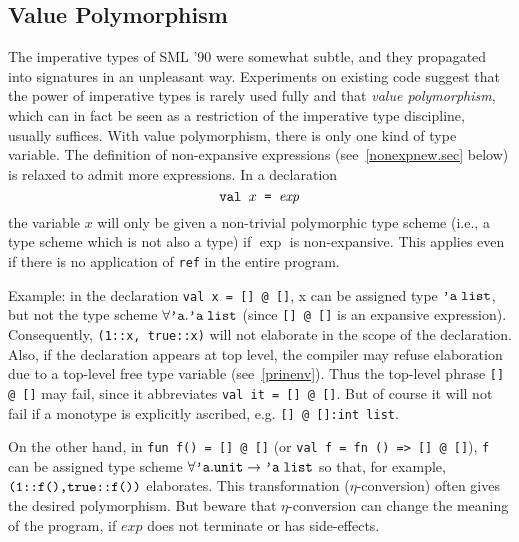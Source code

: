 \subsection{Value Polymorphism}
The imperative types of SML '90 were somewhat subtle,
and they propagated into signatures 
in an unpleasant way.
Experiments on existing code suggest
that the power of imperative types is rarely used fully and that
{\sl value polymorphism}, which can in fact be seen as a restriction of
the imperative type discipline, 
usually suffices\cite{wright95}.
With value polymorphism, there is only one kind of type variable. The definition of 
non-expansive expressions (see~\ref{nonexpnew.sec} below) is relaxed to admit more expressions.
In a declaration
$$\hbox{\tt val $x$ = ${\it exp}$}$$
the variable $x$ will only be given a non-trivial polymorphic type scheme
(i.e., a type scheme which is not also a type) if $\exp$ is non-expansive.
This applies even if there is no application of {\tt ref} in the entire
program.

Example: in the declaration {\tt val x = [] @ []}, x can be assigned
    type $\atyvar\;\LIST$, but not the type scheme 
    $\forall \atyvar. \atyvar\;\LIST$ (since
    {\tt [] @ []} is an expansive expression). Consequently, {\tt (1::x, true::x)}
    will not elaborate in the scope of the declaration. Also, if the
    declaration appears at top level, the compiler may refuse elaboration
    due to a top-level free type variable (see~\ref{prinenv}). 
    Thus the top-level phrase {\tt [] @ []} may fail, since it abbreviates 
    {\tt val it =  [] @ []}.  But of course it will not fail if a monotype
    is explicitly ascribed, e.g. {\tt [] @ []:int list}.
 
    On the other hand, in {\tt fun f() = [] @ []} (or {\tt val f = fn () => [] @ []}), 
    {\tt f} can be assigned type scheme $\forall\atyvar.\UNIT\to\atyvar\;\LIST$ so that, 
    for example, $\hbox{\tt (1::f(),true::f())}$ elaborates. 
    This transformation ($\eta$-conversion) often 
    gives the desired polymorphism. But beware that $\eta$-conversion
    can change the meaning of the program, if $exp$ does not terminate
    or has side-effects.

